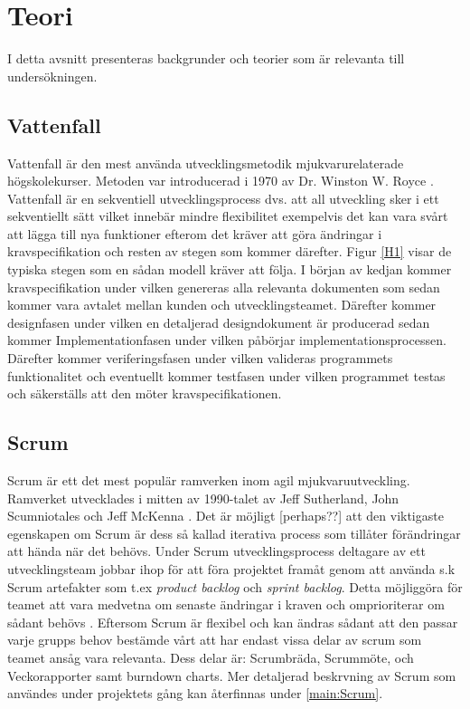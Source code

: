 \section{Teori} \label{sec:Lieth_Wahid-theory}
I detta avsnitt presenteras backgrunder och teorier som är relevanta till undersökningen. 
\subsection{Vattenfall}
Vattenfall är den mest använda utvecklingsmetodik mjukvarurelaterade högskolekurser. Metoden var introducerad i 1970 \cite{Waterfal86:online} av Dr. Winston W. Royce \cite{royce1987managing}. Vattenfall är en sekventiell utvecklingsprocess dvs. att
all utveckling sker i ett sekventiellt sätt vilket innebär mindre flexibilitet exempelvis det kan vara svårt att lägga till nya funktioner efterom det kräver att göra ändringar i kravspecifikation och resten av stegen som kommer därefter. Figur \ref{H1} visar de typiska 
stegen som en sådan modell kräver att följa. I början av kedjan kommer kravspecifikation under vilken genereras alla relevanta dokumenten som sedan kommer vara avtalet mellan kunden och utvecklingsteamet\cite{ASEEPEER95:online,}. Därefter kommer designfasen under vilken en detaljerad designdokument är producerad sedan kommer Implementationfasen under vilken påbörjar implementationsprocessen. Därefter kommer veriferingsfasen under vilken valideras programmets funktionalitet och eventuellt kommer testfasen under vilken programmet testas och säkerställs att den möter kravspecifikationen.
\subsection{Scrum}
Scrum är ett det mest populär ramverken inom agil mjukvaruutveckling. Ramverket utvecklades i mitten av 1990-talet av Jeff Sutherland, John Scumniotales och Jeff McKenna \cite{AgileToo72:online}. Det är möjligt [perhaps??] att den viktigaste egenskapen om Scrum är dess så kallad iterativa process som tillåter förändringar att hända när det behövs. Under  Scrum utvecklingsprocess deltagare av ett utvecklingsteam jobbar ihop för att föra projektet framåt genom att använda s.k Scrum artefakter som t.ex \textit{product backlog} och \textit{sprint backlog}. Detta möjliggöra för teamet att vara medvetna om senaste ändringar i kraven och omprioriterar om  sådant behövs \cite{aamir2017incorporating}. Eftersom Scrum är flexibel och kan ändras sådant att den passar varje grupps behov bestämde vårt att har endast vissa delar av scrum som teamet ansåg vara relevanta. Dess delar är:
Scrumbräda, Scrummöte, och Veckorapporter samt burndown charts. Mer detaljerad beskrvning av Scrum som användes under projektets gång kan återfinnas under \ref{main:Scrum}.